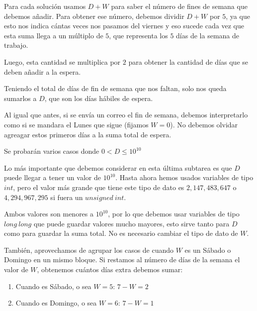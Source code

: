 \documentclass{oci}
\begin{document}
\begin{scoreDescription}
  Para cada soluci\'on usamos $D + W$ para saber el n\'umero de fines de semana
  que debemos a\~nadir. Para obtener ese n\'umero, debemos dividir $D + W$ por $5$,
  ya que esto nos indica c\'antas veces nos pasamos del viernes y eso sucede cada vez
  que esta suma llega a un m\'ultiplo de $5$, que representa los $5$ d\'ias de la semana 
  de trabajo.

  Luego, esta cantidad se multiplica por $2$ para obtener la cantidad de d\'ias que se
  deben a\~nadir a la espera.

  Teniendo el total de d\'ias de fin de semana que nos faltan, solo nos queda sumarlos a
  $D$, que son los d\'ias h\'abiles de espera.

  Al igual que antes, si se env\'ia un correo el fin de semana, debemos interpretarlo como
  si se mandara el Lunes que sigue (fijamos $W=0$). No debemos olvidar agreagar estos primeros
  d\'ias a la suma total de espera.

  \vspace{10mm}
   Se probarán varios casos donde $0 < D \leq 10^{10}$

  Lo m\'as importante que debemos considerar en esta  \'ultima subtarea es que $D$ puede llegar a
  tener un valor de $10^{10}$. Hasta ahora hemos usados variables de tipo $int$, pero el valor m\'as
  grande que tiene este tipo de dato es $2,147,483,647$ o $4,294,967,295$ si fuera un $unsigned\ int$.
  
  Ambos valores son menores a $10^{10}$, por lo que debemos usar variables de tipo $long\ long$ que puede
  guardar valores mucho mayores, esto sirve tanto para $D$ como para guardar la suma total. No es necesario cambiar
  el tipo de dato de $W$.

  Tambi\'en, aprovechamos de agrupar los casos de cuando $W$ es un S\'abado o Domingo en un mismo bloque.
  Si restamos al n\'umero de d\'ias de la semana el valor de $W$, obtenemos cu\'antos d\'ias extra debemos sumar:
  \begin{enumerate}
    \item Cuando es S\'abado, o sea $W = 5$: $7 - W = 2$
    \item Cuando es Domingo, o sea $W = 6$: $7 - W = 1$
  \end{enumerate}
\end{scoreDescription}
\end{document}
